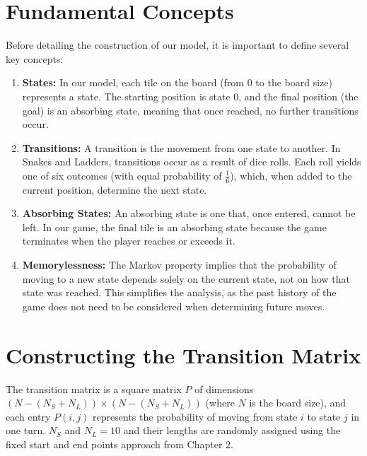 \section{Fundamental Concepts}
Before detailing the construction of our model, it is important to define several key concepts:
\begin{enumerate}
	\item 	\textbf{States:} In our model, each tile on the board (from 0 to the board size) represents a state. The starting position is state 0, and the final position (the goal) is an absorbing state, meaning that once reached, no further transitions occur.
	\item \textbf{Transitions:} A transition is the movement from one state to another. In Snakes and Ladders, transitions occur as a result of dice rolls. Each roll yields one of six outcomes (with equal probability of 	$\frac{1}{6}$), which, when added to the current position, determine the next state.
	\item \textbf{Absorbing States: }An absorbing state is one that, once entered, cannot be left. In our game, the final tile is an absorbing state because the game terminates when the player reaches or exceeds it.
	\item \textbf{Memorylessness: }The Markov property implies that the probability of moving to a new state depends solely on the current state, not on how that state was reached. This simplifies the analysis, as the past history of the game does not need to be considered when determining future moves.
\end{enumerate}

\section{Constructing the Transition Matrix}
The transition matrix is a square matrix $P$ of dimensions $(N- (N_S+N_L))  \times (N- (N_S+N_L))$ (where $N$ is the board size), and each entry $P(i,j)$ represents the probability of moving from state $i$ to state $j$ in one turn. $N_S$ and $N_L = 10$ and their lengths are randomly assigned using the fixed start and end points approach from Chapter 2.


